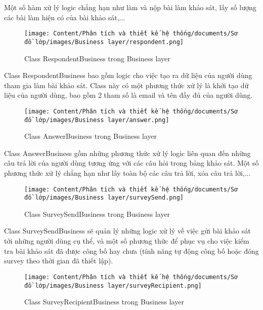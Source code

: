 Một số hàm xử lý logic chẳng hạn như làm và nộp bài làm khảo sát, lấy số lượng các bài làm hiện có của bài khảo sát,...
\begin{figure}[H]
    \centering
    \texttt{[image: Content/Phân tích và thiết kế hệ thống/documents/Sơ đồ lớp/images/Business layer/respondent.png]}
    \vspace{0.5cm}
    \caption{Class RespondentBusiness trong Business layer}
    \label{fig:Class RespondentBusiness trong Business layer}
\end{figure}
\par
Class RespondentBusiness bao gồm logic cho việc tạo ra dữ liệu của người dùng tham gia làm bài khảo sát. Class này có một phương thức xử lý là khởi 
tạo dữ liệu của người dùng, bao gồm 2 tham số là email và tên đầy đủ của người dùng.
\begin{figure}[H]
    \centering
    \texttt{[image: Content/Phân tích và thiết kế hệ thống/documents/Sơ đồ lớp/images/Business layer/answer.png]}
    \vspace{0.5cm}
    \caption{Class AnswerBusiness trong Business layer}
    \label{fig:Class AnswerBusiness trong Business layer}
\end{figure}
\par
Class AnswerBusiness gồm những phương thức xử lý logic liên quan đến những câu trả lời của người dùng tương ứng với các câu hỏi trong bảng khảo sát. 
Một số phương thức xử lý chẳng hạn như lấy toàn bộ các câu trả lời, xóa câu trả lời,...
\begin{figure}[H]
    \centering
    \texttt{[image: Content/Phân tích và thiết kế hệ thống/documents/Sơ đồ lớp/images/Business layer/surveySend.png]}
    \vspace{0.5cm}
    \caption{Class SurveySendBusiness trong Business layer}
    \label{fig:Class SurveySendBusiness trong Business layer}
\end{figure}
\par
Class SurveySendBusiness sẽ quản lý những logic xử lý về việc gửi bài khảo sát tới những người dùng cụ thể, và một số phương thức để phục 
vụ cho việc kiểm tra bài khảo sát đã được công bố hay chưa (tính năng tự động công bố hoặc đóng survey theo thời gian đã thiết lập).
\begin{figure}[H]
    \centering
    \texttt{[image: Content/Phân tích và thiết kế hệ thống/documents/Sơ đồ lớp/images/Business layer/surveyRecipient.png]}
    \vspace{0.5cm}
    \caption{Class SurveyRecipientBusiness trong Business layer}
    \label{fig:Class SurveyRecipientBusiness trong Business layer}
\end{figure}
